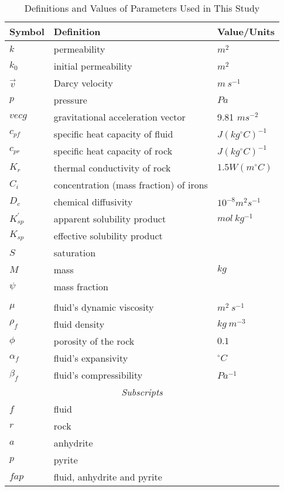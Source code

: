 \begin{table}[]
    \caption{Definitions and Values of Parameters Used in This Study}
    \centering
    \begin{tabular}{lll}
    \hline
    Symbol & Definition          & Value/Units \\ \hline
    $k$    & permeability         & $m^2$       \\ 
    $k_0$  & initial permeability & $m^2$       \\ 
    $\vec{v}$                    & Darcy velocity                            & $m\ s^{-1}$                        \\
    $p$                          & pressure                                  & $Pa$                             \\
    $vec{g}$                     & gravitational acceleration vector         & 9.81 $ms^{-2}$                  \\
    $c_{pf}$  & specific heat capacity of fluid & $J(kg^{\circ}C)^{-1}$ \\
    $c_{pr}$  & specific heat capacity of rock  & $J(kg^{\circ}C)^{-1}$ \\
    $K_r$  & thermal conductivity of rock  & $1.5 W(m^{\circ}C)$ \\
    $C_i$  & concentration (mass fraction) of irons  & \\
    $D_c$  & chemical diffusivity  & $10^{-8} m^2s^{-1}$ \\
    $K_{sp}^{\prime}$  & apparent solubility product  & $mol\ kg^{-1}$ \\
    $K_{sp}$  & effective solubility product  &  \\
    $S$ & saturation & \\
    $M$  & mass  & $kg$  \\
    $\psi$  & mass fraction & \\
    \multicolumn{3}{c}{\centering{\textit{Greek Symbols}}}  \\
    $\mu$ & fluid's dynamic viscosity & $m^2\ s^{-1}$ \\
    $\rho_f$  & fluid density & $kg\ m^{-3}$ \\
    $\phi$ & porosity of the rock & $0.1$ \\
    $\alpha_f$  & fluid's expansivity & $^{\circ}C$ \\
    $\beta_f$ & fluid's compressibility & $Pa^{-1}$ \\
    \multicolumn{3}{c}{\textit{Subscripts}} \\
    $f$ & fluid & \\
    $r$ & rock & \\
    $a$ & anhydrite & \\
    $p$ & pyrite & \\
    $fap$ & fluid, anhydrite and pyrite & \\
    \hline
    \end{tabular}
    \label{tab:symbols}
\end{table}
